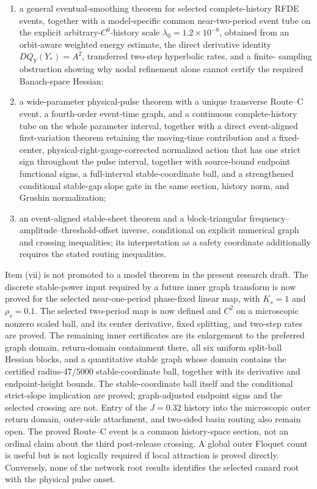 \begin{enumerate}[label=(\roman*)]
  section radius \(r_6=10^{-335}\), full complete-history tube radius
  \(R_6=10^{-3}\), and return constant \(\Lambda_6\le0.561839\);
\item a general eventual-smoothing theorem for selected complete-history
  RFDE events, together with a model-specific common near-two-period event
  tube on the explicit arbitrary-\(C^0\)-history scale
  \(\lambda_0=1.2\times10^{-8}\), obtained from an orbit-aware weighted
  energy estimate, the direct derivative identity
  \(DQ_Y(Y_*)=A^2\), transferred two-step hyperbolic rates, and a finite-
  sampling obstruction showing why nodal refinement alone cannot certify
  the required Banach-space Hessian;
\item a wide-parameter physical-pulse theorem with a unique transverse
  Route--C event, a fourth-order event-time graph, and a continuous
  complete-history tube on the whole parameter interval, together with a
  direct event-aligned first-variation theorem retaining the moving-time
  contribution and a fixed-center, physical-right-gauge-corrected normalized
  action that has one strict sign throughout the pulse interval, together
  with source-bound endpoint functional signs, a full-interval
  stable-coordinate ball, and a strengthened conditional stable-gap slope
  gate in the same section, history norm, and Grushin normalization;
\item an event-aligned stable-sheet theorem and a block-triangular
  frequency--amplitude--threshold-offset inverse, conditional on explicit
  numerical graph and crossing inequalities; its interpretation as a safety
  coordinate additionally requires the stated routing inequalities.
\end{enumerate}

Item (vii) is not promoted to a model theorem in the present research draft.
The discrete stable-power input required by a future inner graph transform is
now proved for the selected near-one-period phase-fixed linear map, with
\(K_s=1\) and \(\rho_s=0.1\).  The selected two-period map is now defined and
\(C^2\) on a microscopic nonzero scaled ball, and its center derivative,
fixed splitting, and two-step rates are proved.  The remaining inner
certificates are its enlargement to the preferred graph domain, return-domain
containment there, all six uniform split-ball Hessian blocks, and a
quantitative stable graph whose domain contains the certified
radius-\(47/5000\) stable-coordinate ball,
together with its derivative and endpoint-height bounds.  The stable-coordinate
ball itself and the conditional strict-slope implication are proved;
graph-adjusted endpoint signs and the selected crossing are not.  Entry of the
\(J=0.32\) history into the microscopic outer return domain, outer-side
attachment, and two-sided basin routing also remain open.  The proved Route--C
event is a common history-space section, not an ordinal claim about the third
post-release crossing.  A global outer Floquet count is useful but is not
logically required if local attraction is proved directly.  Conversely, none
of the network root results identifies the selected canard root with the
physical pulse onset.

